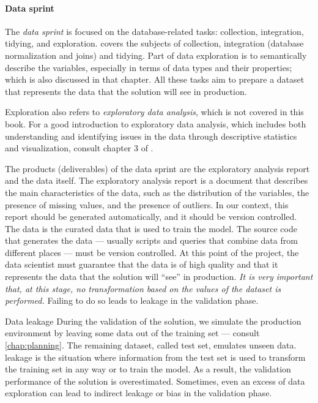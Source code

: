 \paragraph{Data sprint}
The \emph{data sprint} is focused on the database-related tasks: collection, integration, tidying, and
exploration.   covers the subjects of collection, integration (database
normalization and joins) and tidying.  Part of data exploration is to semantically describe
the variables, especially in terms of data types and their properties; which is also
discussed in that chapter.  All these tasks aim to prepare a dataset that represents
the data that the solution will see in production.

Exploration also refers to \emph{exploratory
data analysis}, which is not covered in this book. %
For a good introduction to exploratory data analysis, which includes both understanding
and identifying issues in the data through descriptive statistics and visualization, consult chapter 3 of
\textcite{Zumel2019}.

The products (deliverables) of the data sprint are the exploratory analysis report and the
data itself.  The exploratory analysis report is a document that describes the main
characteristics of the data, such as the distribution of the variables, the presence of
missing values, and the presence of outliers.  In our context, this report should be
generated automatically, and it should be version controlled.  The data is the curated
data that is used to train the model.  The source code that generates the data ---
usually scripts and queries that combine data from different places --- must be version
controlled.  At this point of the project, the data scientist must guarantee that the data
is of high quality and that it represents the data that the solution will ``see'' in
production.  \emph{It is very important that, at this stage, no transformation based
on the values of the dataset is performed.}  Failing to do so leads to \gls{leakage} in
the validation phase.

\begin{definition}{Data leakage}
  During the validation of the solution, we simulate the production environment by leaving
  some data out of the training set --- consult \cref{chap:planning}.  The remaining
  dataset, called test set, emulates unseen data.  \Gls{leakage} is the situation where
  information from the test set is used to transform the training set in any way or to
  train the model.  As a result, the validation performance of the solution is
  overestimated.  Sometimes, even an excess of data exploration can lead to indirect
  leakage or bias in the validation phase.
\end{definition}

